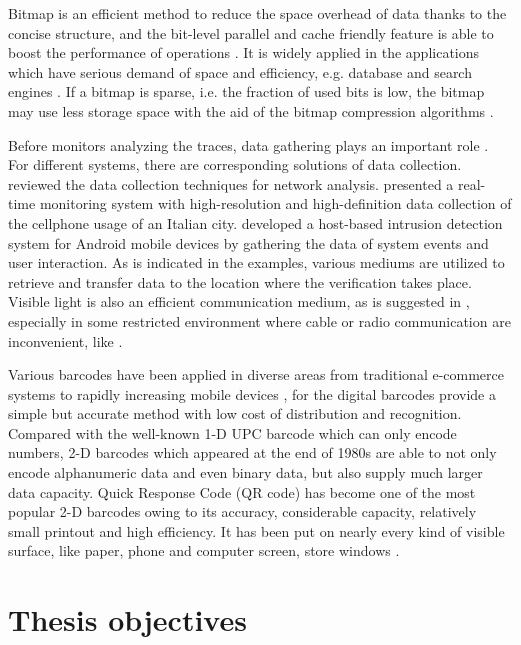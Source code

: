Bitmap is an efficient method to reduce the space overhead of data thanks to the concise structure, and the bit-level parallel and cache friendly feature is able to boost the performance of operations \citep{culpepper2010efficient}. It is widely applied in the applications which have serious demand of space and efficiency, e.g. database and search engines \citep{lemire2014}. If a bitmap is sparse, i.e. the fraction of used bits is low, the bitmap may use less storage space with the aid of the bitmap compression algorithms \citep{antoshenkov1995byte}.

Before monitors analyzing the traces, data gathering plays an important role \citep{casley1988collection}. For different systems, there are corresponding solutions of data collection. \cite{zwijze2005auditing} reviewed the data collection techniques for network analysis. \cite{calabrese2011real} presented a real-time monitoring system with high-resolution and high-definition data collection of the cellphone usage of an Italian city. \cite{shabtai2010applying} developed a host-based intrusion detection system for Android mobile devices by gathering the data of system events and user interaction. As is indicated in the examples, various mediums are utilized to retrieve and transfer data to the location where the verification takes place. Visible light is also an efficient communication medium, as is suggested in \cite{komine2004fundamental}, especially in some restricted environment where cable or radio communication are inconvenient, like \cite{vasilescu2005data}.

Various barcodes have been applied in diverse areas from traditional e-commerce systems to rapidly increasing mobile devices \citep{gao2007understanding}, for the digital barcodes provide a simple but accurate method with low cost of distribution and recognition. Compared with the well-known 1-D UPC barcode which can only encode numbers, 2-D barcodes which appeared at the end of 1980s are able to not only encode alphanumeric data and even binary data, but also supply much larger data capacity. Quick Response Code (QR code) \citep{qrcode-about} has become one of the most popular 2-D barcodes owing to its accuracy, considerable capacity, relatively small printout and high efficiency. It has been put on nearly every kind of visible surface, like paper, phone and computer screen, store windows \citep{okazaki2012benchmarking}.

\section{Thesis objectives}


